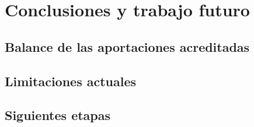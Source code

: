 \chapter{Conclusiones y trabajo futuro}
\label{cap:conclusiones}

\section{Balance de las aportaciones acreditadas}
\label{sec:balance}

\section{Limitaciones actuales}
\label{sec:limites}

\section{Siguientes etapas}
\label{sec:siguientes}
